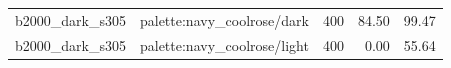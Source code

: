 \begin{longtable}{l>{\raggedright\arraybackslash}p{.42\linewidth}rrr}
b2000\_\allowbreak{}dark\_\allowbreak{}s305 & %
palette:navy\_\allowbreak{}coolrose/dark & %
400 & %
84.50 & %
99.47 \\ %

b2000\_\allowbreak{}dark\_\allowbreak{}s305 & %
palette:navy\_\allowbreak{}coolrose/light & %
400 & %
0.00 & %
55.64 \\ %


\end{longtable}
